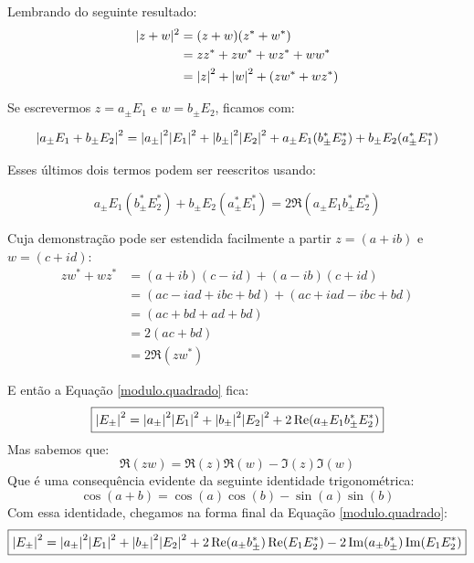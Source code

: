 \documentclass[12pt,a4paper]{report}
\begin{document}
Lembrando do seguinte resultado:
\begin{align*}
|z+w|^2 & = (z+w)(z^* + w^*)\\
        & = zz^*+zw^*+wz^*+ww^*\\
        & = \abs{z}^2+\abs{w}^2+(zw^*+wz^*)\\
\end{align*}

Se escrevermos $z=a_{\pm}E_1$ e $w=b_{\pm}E_2$, ficamos com:

\begin{equation*}
   \abs{a_{\pm}E_1+b_{\pm}E_2}^2 = \abs{a_{\pm}}^2\abs{E_{1}}^2+\abs{b_{\pm}}^2\abs{E_{2}}^2+a_{\pm}E_1(b^*_{\pm}E^*_2)+b_{\pm}E_2(a^*_{\pm}E^*_1)
\end{equation*}

Esses últimos dois termos podem ser reescritos usando:

\begin{equation*}
    a_{\pm}E_1(b^*_{\pm}E^*_2)+b_{\pm}E_2(a^*_{\pm}E^*_1)=2\Re(a_{\pm}E_1b^*_{\pm}E^*_2)
\end{equation*}

Cuja demonstração pode ser estendida facilmente a partir $z=(a+ib)$ e $w=(c+id)$:
\begin{align*}
zw^*+wz^*   & = (a+ib)(c-id)+(a-ib)(c+id)\\
            & = (ac-iad+ibc+bd)+(ac+iad-ibc+bd)\\
            & = (ac+bd+ad+bd)\\
            & = 2(ac+bd)\\
            & = 2\Re(zw^*)
\end{align*}

E então a Equação \ref{modulo.quadrado} fica:
\begin{equation}
   \boxed{\abs{E_{\pm}}^2=\abs{a_{\pm}}^2\abs{E_{1}}^2+\abs{b_{\pm}}^2\abs{E_{2}}^2+2\Re(a_{\pm}E_1b^*_{\pm}E^*_2)}
   \label{identity.sq.abs}
\end{equation}
Mas sabemos que:
\begin{equation}
    \Re(zw)=\Re(z)\Re(w)-\Im(z)\Im(w)
\end{equation}
Que é uma consequência evidente da seguinte identidade trigonométrica:
\begin{equation}
    \cos(a+b)=\cos(a)\cos(b)-\sin(a)\sin(b)
\end{equation}
Com essa identidade, chegamos na forma final da Equação \ref{modulo.quadrado}:
\begin{equation*}
   \boxed{\abs{E_{\pm}}^2=\abs{a_{\pm}}^2\abs{E_{1}}^2 + \abs{b_{\pm}}^2\abs{E_{2}}^2 + 2\Re(a_{\pm}b^*_{\pm})\Re(E_1E^*_{2})- 2\Im(a_{\pm}b^*_{\pm})\Im(E_1E^*_{2})}
\end{equation*}
\end{document}
